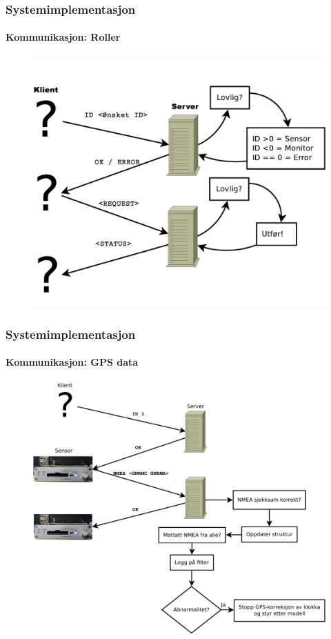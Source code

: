 \documentclass[xcolor=table]{beamer}
\begin{document}
\begin{frame}
\frametitle{Systemimplementasjon}
  \framesubtitle{Kommunikasjon: Roller}
    \begin{figure}
      \includegraphics[scale=0.3]{thesis/graphics/server_explain.pdf}
    \end{figure}
\end{frame}

\begin{frame}
\frametitle{Systemimplementasjon}
  \framesubtitle{Kommunikasjon: GPS data}
    \begin{figure}
      \includegraphics[scale=0.25]{thesis/graphics/sensor_nmea.pdf}
    \end{figure}
\end{frame}
\end{document}
